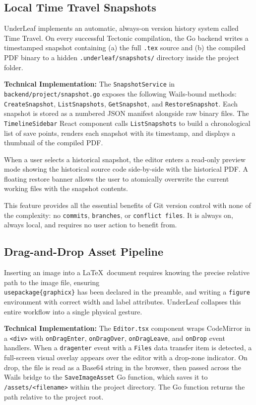 \documentclass[11pt, a4paper]{article}
\begin{document}
\subsection{Local Time Travel Snapshots}

UnderLeaf implements an automatic, always-on version history system called Time Travel. On every successful Tectonic compilation, the Go backend writes a timestamped snapshot containing (a) the full \texttt{.tex} source and (b) the compiled PDF binary to a hidden \texttt{.underleaf/snapshots/} directory inside the project folder.

\textbf{Technical Implementation:} The \texttt{SnapshotService} in \texttt{backend/project/snapshot.go} exposes the following Wails-bound methods: \texttt{CreateSnapshot}, \texttt{ListSnapshots}, \texttt{GetSnapshot}, and \texttt{RestoreSnapshot}. Each snapshot is stored as a numbered JSON manifest alongside raw binary files. The \texttt{TimelineSidebar} React component calls \texttt{ListSnapshots} to build a chronological list of save points, renders each snapshot with its timestamp, and displays a thumbnail of the compiled PDF.

When a user selects a historical snapshot, the editor enters a read-only preview mode showing the historical source code side-by-side with the historical PDF. A floating restore banner allows the user to atomically overwrite the current working files with the snapshot contents.

This feature provides all the essential benefits of Git version control with none of the complexity: no \texttt{commits}, \texttt{branches}, or \texttt{conflict files}. It is always on, always local, and requires no user action to benefit from.

\subsection{Drag-and-Drop Asset Pipeline}

Inserting an image into a \LaTeX\ document requires knowing the precise relative path to the image file, ensuring \texttt{\\usepackage\{graphicx\}} has been declared in the preamble, and writing a \texttt{figure} environment with correct width and label attributes. UnderLeaf collapses this entire workflow into a single physical gesture.

\textbf{Technical Implementation:} The \texttt{Editor.tsx} component wraps CodeMirror in a \texttt{<div>} with \texttt{onDragEnter}, \texttt{onDragOver}, \texttt{onDragLeave}, and \texttt{onDrop} event handlers. When a \texttt{dragenter} event with a \texttt{Files} data transfer item is detected, a full-screen visual overlay appears over the editor with a drop-zone indicator. On drop, the file is read as a Base64 string in the browser, then passed across the Wails bridge to the \texttt{SaveImageAsset} Go function, which saves it to \texttt{/assets/<filename>} within the project directory. The Go function returns the path relative to the project root.
\end{document}
